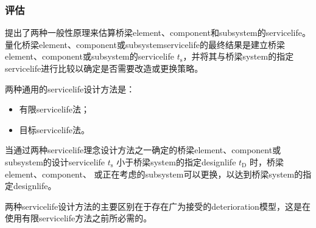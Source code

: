 \subsubsection*{评估}
提出了两种一般性原理来估算桥梁\gls*{element}、\gls*{component}和\gls*{subsystem}的\gls*{servicelife}。量化桥梁\gls*{element}、\gls*{component}或\gls*{subsystem}\gls*{servicelife}的最终结果是建立桥梁\gls*{element}、\gls*{component}或\gls*{subsystem}的\gls*{servicelife} $t_\text{s}$，并将其与桥梁\gls*{system}的指定\gls*{servicelife}进行比较以确定是否需要改造或更换策略。

两种通用的\gls*{servicelife}设计方法是：
\begin{itemize}
  \item 有限\gls*{servicelife}法；
  \item 目标\gls*{servicelife}法。
\end{itemize}

当通过两种\gls*{servicelife}理念设计方法之一确定的桥梁\gls*{element}、\gls*{component}或\gls*{subsystem}的设计\gls*{servicelife} $t_\text{s}$ 小于桥梁\gls*{system}的指定\gls*{designlife} $t_\text{D}$ 时，桥梁\gls*{element}、\gls*{component}、 或正在考虑的\gls*{subsystem}可以更换，以达到桥梁\gls*{system}的指定\gls*{designlife}。

两种\gls*{servicelife}设计方法的主要区别在于存在广为接受的\gls*{deterioration}模型，这是在使用有限\gls*{servicelife}方法之前所必需的。


